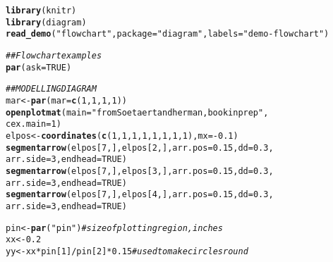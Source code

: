 \documentclass{article}\usepackage[]{graphicx}\usepackage[]{xcolor}
\makeatletter
\newcommand{\hlnum}[1]{\textcolor[rgb]{0.686,0.059,0.569}{#1}}%
\newcommand{\hlsng}[1]{\textcolor[rgb]{0.192,0.494,0.8}{#1}}%
\newcommand{\hlcom}[1]{\textcolor[rgb]{0.678,0.584,0.686}{\textit{#1}}}%
\newcommand{\hlopt}[1]{\textcolor[rgb]{0,0,0}{#1}}%
\newcommand{\hldef}[1]{\textcolor[rgb]{0.345,0.345,0.345}{#1}}%
\newcommand{\hlkwb}[1]{\textcolor[rgb]{0.69,0.353,0.396}{#1}}%
\newcommand{\hlkwc}[1]{\textcolor[rgb]{0.333,0.667,0.333}{#1}}%
\newcommand{\hlkwd}[1]{\textcolor[rgb]{0.737,0.353,0.396}{\textbf{#1}}}%
\newenvironment{kframe}{%
 \def\at@end@of@kframe{}%
 \ifinner\ifhmode%
  \def\at@end@of@kframe{\end{minipage}}%
  \begin{minipage}{\columnwidth}%
 \fi\fi%
 \def\FrameCommand##1{\hskip\@totalleftmargin \hskip-\fboxsep
 \colorbox{shadecolor}{##1}\hskip-\fboxsep
     \hskip-\linewidth \hskip-\@totalleftmargin \hskip\columnwidth}%
 \MakeFramed {\advance\hsize-\width
   \@totalleftmargin\z@ \linewidth\hsize
   \@setminipage}}%
 {\par\unskip\endMakeFramed%
 \at@end@of@kframe}
\newenvironment{knitrout}{}{} %
\makeatother
\begin{document}
\begin{knitrout}
\color{fgcolor}\begin{kframe}
\begin{alltt}
\hlkwd{library}\hldef{(knitr)}
\hlkwd{library}\hldef{(diagram)}
\hlkwd{read_demo}\hldef{(}\hlsng{"flowchart"}\hldef{,} \hlkwc{package} \hldef{=} \hlsng{"diagram"}\hldef{,} \hlkwc{labels} \hldef{=} \hlsng{"demo-flowchart"}\hldef{)}
\end{alltt}
\end{kframe}
\end{knitrout}
\begin{knitrout}
\color{fgcolor}\begin{kframe}
\begin{alltt}
\hlcom{## Flowchart examples}
\hlkwd{par}\hldef{(}\hlkwc{ask} \hldef{=} \hlnum{TRUE}\hldef{)}

\hlcom{## MODELLING DIAGRAM}
\hldef{mar} \hlkwb{<-} \hlkwd{par}\hldef{(}\hlkwc{mar} \hldef{=} \hlkwd{c}\hldef{(}\hlnum{1}\hldef{,} \hlnum{1}\hldef{,} \hlnum{1}\hldef{,} \hlnum{1}\hldef{))}
\hlkwd{openplotmat}\hldef{(}\hlkwc{main} \hldef{=} \hlsng{"from Soetaert and herman, book in prep"}\hldef{,}
    \hlkwc{cex.main} \hldef{=} \hlnum{1}\hldef{)}
\hldef{elpos} \hlkwb{<-} \hlkwd{coordinates}\hldef{(}\hlkwd{c}\hldef{(}\hlnum{1}\hldef{,} \hlnum{1}\hldef{,} \hlnum{1}\hldef{,} \hlnum{1}\hldef{,} \hlnum{1}\hldef{,} \hlnum{1}\hldef{,} \hlnum{1}\hldef{,} \hlnum{1}\hldef{),} \hlkwc{mx} \hldef{=} \hlopt{-}\hlnum{0.1}\hldef{)}
\hlkwd{segmentarrow}\hldef{(elpos[}\hlnum{7}\hldef{, ], elpos[}\hlnum{2}\hldef{, ],} \hlkwc{arr.pos} \hldef{=} \hlnum{0.15}\hldef{,} \hlkwc{dd} \hldef{=} \hlnum{0.3}\hldef{,}
    \hlkwc{arr.side} \hldef{=} \hlnum{3}\hldef{,} \hlkwc{endhead} \hldef{=} \hlnum{TRUE}\hldef{)}
\hlkwd{segmentarrow}\hldef{(elpos[}\hlnum{7}\hldef{, ], elpos[}\hlnum{3}\hldef{, ],} \hlkwc{arr.pos} \hldef{=} \hlnum{0.15}\hldef{,} \hlkwc{dd} \hldef{=} \hlnum{0.3}\hldef{,}
    \hlkwc{arr.side} \hldef{=} \hlnum{3}\hldef{,} \hlkwc{endhead} \hldef{=} \hlnum{TRUE}\hldef{)}
\hlkwd{segmentarrow}\hldef{(elpos[}\hlnum{7}\hldef{, ], elpos[}\hlnum{4}\hldef{, ],} \hlkwc{arr.pos} \hldef{=} \hlnum{0.15}\hldef{,} \hlkwc{dd} \hldef{=} \hlnum{0.3}\hldef{,}
    \hlkwc{arr.side} \hldef{=} \hlnum{3}\hldef{,} \hlkwc{endhead} \hldef{=} \hlnum{TRUE}\hldef{)}

\hldef{pin} \hlkwb{<-} \hlkwd{par}\hldef{(}\hlsng{"pin"}\hldef{)}  \hlcom{# size of plotting region, inches}
\hldef{xx} \hlkwb{<-} \hlnum{0.2}
\hldef{yy} \hlkwb{<-} \hldef{xx} \hlopt{*} \hldef{pin[}\hlnum{1}\hldef{]}\hlopt{/}\hldef{pin[}\hlnum{2}\hldef{]} \hlopt{*} \hlnum{0.15}  \hlcom{# used to make circles round}


\end{alltt}
\end{kframe}
\end{knitrout}
\end{document}
